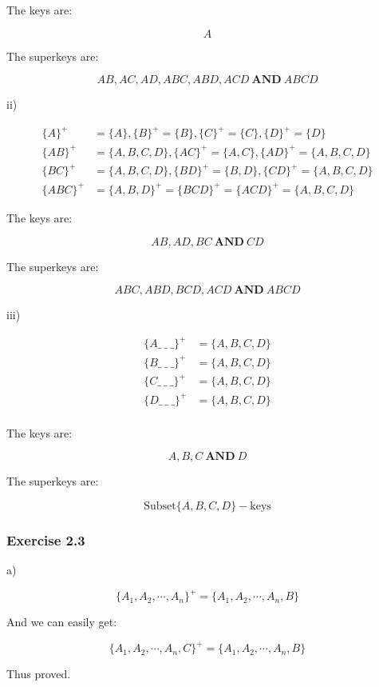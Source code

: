 \documentclass[../../main.tex]{subfiles}
\begin{document}
The keys are:

$$
A
$$

The superkeys are:

$$
AB, AC, AD, ABC, ABD, ACD \ \mathbf{AND} \ ABCD
$$

ii)

\begin{align*}
  \{A\}^{+} &= \{A\},   \{B\}^{+} = \{B\},
  \{C\}^{+} = \{C\}, \{D\}^{+}= \{D\} \\
  \{AB\}^{+} &= \{A,B,C,D\},  \{AC\}^{+} = \{A,C\},
  \{AD\}^{+} = \{A,B,C,D\} \\
  \{BC\}^{+} &= \{A,B,C,D\}, \{BD\}^{+} = \{B,D\},
  \{CD\}^{+} = \{A,B,C,D\} \\
  \{ABC\}^{+} &= \{A,B,D\}^{+} = \{BCD\}^{+} = \{ACD\}^{+} = \{A,B,C,D\}
\end{align*}

The keys are:

$$
AB, AD, BC \ \mathbf{AND} \ CD
$$

The superkeys are:

$$
ABC, ABD, BCD, ACD \ \mathbf{AND} \ ABCD
$$


iii)

\begin{align*}
  \{A \_ \ \_ \ \_ \}^{+} &= \{A,B,C,D\} \\
  \{B\_ \ \_ \ \_ \}^{+} &= \{A,B,C,D\} \\
  \{C\_ \ \_ \ \_ \}^{+} &= \{A,B,C,D\} \\
  \{D\_ \ \_ \ \_ \}^{+} &= \{A,B,C,D\} \\
\end{align*}

The keys are:

$$
A, B, C \ \mathbf{AND} \ D
$$

The superkeys are:

$$
\mbox{Subset} \{A,B,C,D\} - \mbox{keys}
$$

\subsubsection*{Exercise 2.3}

a)

$$
\{A_{1}, A_{2}, \cdots, A_{n}\} ^ {+} = \{A_{1}, A_{2}, \cdots, A_{n}, B\}
$$

And we can easily get:

$$
\{A_{1}, A_{2}, \cdots, A_{n}, C\} ^ {+} = \{A_{1}, A_{2}, \cdots, A_{n}, B\}
$$

Thus proved.
\end{document}
